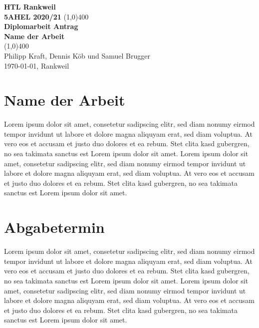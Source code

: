 \documentclass[11pt]{article}
\begin{document}
\begin{titlepage}
  \begin{center}
    \vspace*{1cm}
    \large{\textbf{HTL Rankweil}}\\
    \large{\textbf{5AHEL 2020/21}}
    \vfill
    \line(1,0){400}\\[1mm]
    \huge{\textbf{Diplomarbeit Antrag}}\\[3mm]
    \large{\textbf{Name der Arbeit}}\\[1mm]
    \line(1,0){400}\\
    \vfill
    Philipp Kraft, Dennis Köb und Samuel Brugger\\[3mm]
    \today, Rankweil
  \end{center}
\end{titlepage}

\tableofcontents
\thispagestyle{empty}
\clearpage

\setcounter{page}{1}
\section{Name der Arbeit}
Lorem ipsum dolor sit amet, consetetur sadipscing elitr, sed diam nonumy eirmod tempor invidunt ut labore et dolore magna aliquyam erat, sed diam voluptua. At vero eos et accusam et justo duo dolores et ea rebum. Stet clita kasd gubergren, no sea takimata sanctus est Lorem ipsum dolor sit amet. Lorem ipsum dolor sit amet, consetetur sadipscing elitr, sed diam nonumy eirmod tempor invidunt ut labore et dolore magna aliquyam erat, sed diam voluptua. At vero eos et accusam et justo duo dolores et ea rebum. Stet clita kasd gubergren, no sea takimata sanctus est Lorem ipsum dolor sit amet.

\section{Abgabetermin}
Lorem ipsum dolor sit amet, consetetur sadipscing elitr, sed diam nonumy eirmod tempor invidunt ut labore et dolore magna aliquyam erat, sed diam voluptua. At vero eos et accusam et justo duo dolores et ea rebum. Stet clita kasd gubergren, no sea takimata sanctus est Lorem ipsum dolor sit amet. Lorem ipsum dolor sit amet, consetetur sadipscing elitr, sed diam nonumy eirmod tempor invidunt ut labore et dolore magna aliquyam erat, sed diam voluptua. At vero eos et accusam et justo duo dolores et ea rebum. Stet clita kasd gubergren, no sea takimata sanctus est Lorem ipsum dolor sit amet.
\end{document}
